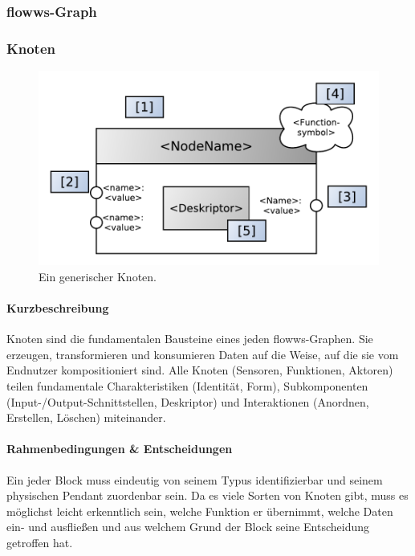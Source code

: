 \subsubsection{flowws-Graph}
\subsubsection{Knoten}
\begin{figure}[h]
  \centering
  \includegraphics[width=.75\textwidth]{bilder/chapter4/chapter4_3/genericnode.pdf}
  \caption{Ein generischer Knoten.}
  \label{fig:genericnode}
\end{figure}

\paragraph{Kurzbeschreibung} Knoten sind die fundamentalen Bausteine eines jeden flowws-Graphen. Sie erzeugen, transformieren und konsumieren Daten auf die Weise, auf die sie vom Endnutzer kompositioniert sind. Alle Knoten (Sensoren, Funktionen, Aktoren) teilen fundamentale Charakteristiken (Identität, Form), Subkomponenten (Input-/Output-Schnittstellen, Deskriptor) und Interaktionen (Anordnen, Erstellen, Löschen) miteinander. 

\paragraph{Rahmenbedingungen \& Entscheidungen} Ein jeder Block muss eindeutig von seinem Typus identifizierbar und seinem physischen Pendant zuordenbar sein. Da es viele Sorten von Knoten gibt, muss es möglichst leicht erkenntlich sein, welche Funktion er übernimmt, welche Daten ein- und ausfließen und aus welchem Grund der Block seine Entscheidung getroffen hat.

